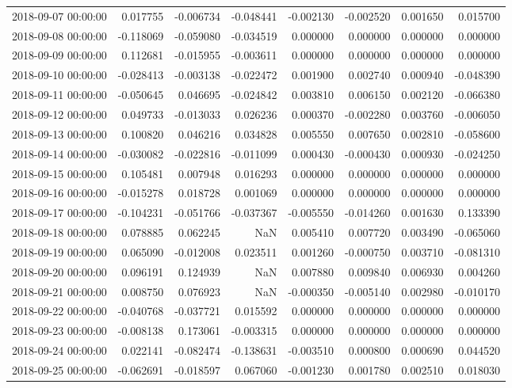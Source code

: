 \begin{tabular}{lrrrrrrr}
2018-09-07 00:00:00 & 0.017755 & -0.006734 & -0.048441 & -0.002130 & -0.002520 & 0.001650 & 0.015700 \\
2018-09-08 00:00:00 & -0.118069 & -0.059080 & -0.034519 & 0.000000 & 0.000000 & 0.000000 & 0.000000 \\
2018-09-09 00:00:00 & 0.112681 & -0.015955 & -0.003611 & 0.000000 & 0.000000 & 0.000000 & 0.000000 \\
2018-09-10 00:00:00 & -0.028413 & -0.003138 & -0.022472 & 0.001900 & 0.002740 & 0.000940 & -0.048390 \\
2018-09-11 00:00:00 & -0.050645 & 0.046695 & -0.024842 & 0.003810 & 0.006150 & 0.002120 & -0.066380 \\
2018-09-12 00:00:00 & 0.049733 & -0.013033 & 0.026236 & 0.000370 & -0.002280 & 0.003760 & -0.006050 \\
2018-09-13 00:00:00 & 0.100820 & 0.046216 & 0.034828 & 0.005550 & 0.007650 & 0.002810 & -0.058600 \\
2018-09-14 00:00:00 & -0.030082 & -0.022816 & -0.011099 & 0.000430 & -0.000430 & 0.000930 & -0.024250 \\
2018-09-15 00:00:00 & 0.105481 & 0.007948 & 0.016293 & 0.000000 & 0.000000 & 0.000000 & 0.000000 \\
2018-09-16 00:00:00 & -0.015278 & 0.018728 & 0.001069 & 0.000000 & 0.000000 & 0.000000 & 0.000000 \\
2018-09-17 00:00:00 & -0.104231 & -0.051766 & -0.037367 & -0.005550 & -0.014260 & 0.001630 & 0.133390 \\
2018-09-18 00:00:00 & 0.078885 & 0.062245 & NaN & 0.005410 & 0.007720 & 0.003490 & -0.065060 \\
2018-09-19 00:00:00 & 0.065090 & -0.012008 & 0.023511 & 0.001260 & -0.000750 & 0.003710 & -0.081310 \\
2018-09-20 00:00:00 & 0.096191 & 0.124939 & NaN & 0.007880 & 0.009840 & 0.006930 & 0.004260 \\
2018-09-21 00:00:00 & 0.008750 & 0.076923 & NaN & -0.000350 & -0.005140 & 0.002980 & -0.010170 \\
2018-09-22 00:00:00 & -0.040768 & -0.037721 & 0.015592 & 0.000000 & 0.000000 & 0.000000 & 0.000000 \\
2018-09-23 00:00:00 & -0.008138 & 0.173061 & -0.003315 & 0.000000 & 0.000000 & 0.000000 & 0.000000 \\
2018-09-24 00:00:00 & 0.022141 & -0.082474 & -0.138631 & -0.003510 & 0.000800 & 0.000690 & 0.044520 \\
2018-09-25 00:00:00 & -0.062691 & -0.018597 & 0.067060 & -0.001230 & 0.001780 & 0.002510 & 0.018030 \\

\end{tabular}
